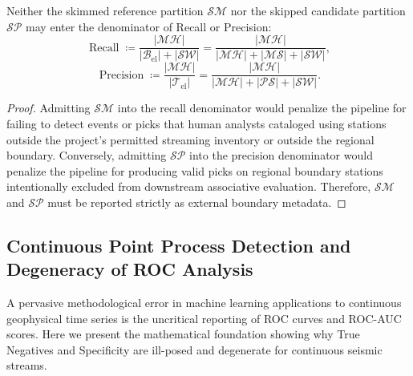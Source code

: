 \begin{corollary}
  \label{cor:supp_insulation}
  Neither the skimmed reference partition $\mathcal{SM}$ nor the
  skipped candidate
  partition $\mathcal{SP}$ may enter the denominator of Recall or Precision:
  \begin{equation}
    \operatorname{Recall} \coloneqq
    \frac{|\mathcal{MH}|}{|\mathcal{B}_{\mathrm{el}}| + |\mathcal{SW}|}
    = \frac{|\mathcal{MH}|}{|\mathcal{MH}| + |\mathcal{MS}| + |\mathcal{SW}|},
    \label{eq:supp_correct_recall}
  \end{equation}
  \begin{equation}
    \operatorname{Precision} \coloneqq
    \frac{|\mathcal{MH}|}{|\mathcal{T}_{\mathrm{el}}|}
    = \frac{|\mathcal{MH}|}{|\mathcal{MH}| + |\mathcal{PS}| + |\mathcal{SW}|}.
    \label{eq:supp_correct_precision}
  \end{equation}
\end{corollary}

\begin{proof}
  Admitting $\mathcal{SM}$ into the recall denominator would
  penalize the pipeline for failing
  to detect events or picks that human analysts cataloged using
  stations outside the project's
  permitted streaming inventory or outside the regional boundary.
  Conversely, admitting $\mathcal{SP}$ into the precision
  denominator would penalize the pipeline
  for producing valid picks on regional boundary stations
  intentionally excluded from downstream
  associative evaluation. Therefore, $\mathcal{SM}$ and
  $\mathcal{SP}$ must be reported strictly
  as external boundary metadata.
\end{proof}


\subsection*{Continuous Point Process Detection and Degeneracy of ROC Analysis}
\label{subsec:supp_roc_degeneracy}

A pervasive methodological error in machine learning applications to
continuous geophysical
time series is the uncritical reporting of \ac{ROC} curves and
\ac{ROC-AUC} scores.
Here we present the mathematical foundation showing why True
Negatives and Specificity
are ill-posed and degenerate for continuous seismic streams.

